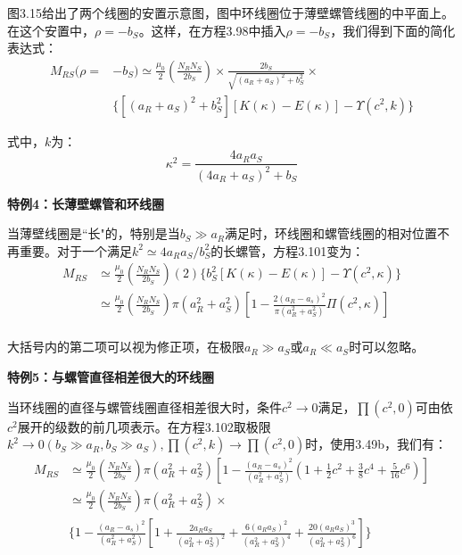 图3.15给出了两个线圈的安置示意图，图中环线圈位于薄壁螺管线圈的中平面上。在这个安置中，$\rho=-b_S$。这样，在方程3.98中插入$\rho=-b_S$，我们得到下面的简化表达式：
  \begin{equation}
  \begin{split}
M_{RS}(\rho=&-b_S)\simeq\frac{\mu_0}{2}(\frac{N_R N_S}{2b_S})\times\frac{2b_S}{\sqrt{(a_R+a_S)^2+b_S^2}}\times\\
&\{[(a_R+a_S)^2+b_S^2][K(\kappa)-E(\kappa)]-\Upsilon(c^2,k)\}%
\end{split}
\end{equation}

  式中，$k$为：
  \begin{equation*}
\kappa^2=\frac{4a_Ra_S}{(4a_R+a_S)^2+b_S}%
\end{equation*}

\textbf{特例4：长薄壁螺管和环线圈} 

当薄壁线圈是``长"的，特别是当$b_S\gg a_R$满足时，环线圈和螺管线圈的相对位置不再重要。对于一个满足$k^2\simeq 4a_R a_S/b_S^2$的长螺管，方程3.101变为：
\begin{equation}
\begin{split}
M_{RS}&\simeq\frac{\mu_0}{2}(\frac{N_RN_S}{2b_S})(2)\{b_S^2[K(\kappa)-E(\kappa)]-\Upsilon(c^2,\kappa)\}\\
&\simeq\frac{\mu_0}{2}(\frac{N_RN_S}{2b_S})\pi(a_R^2+a_S^2)[1-\frac{2(a_R-a_s)^2}{\pi(a_R^2+a_S^2)}\Pi(c^2,\kappa)]\\%
\end{split}
\end{equation}

大括号内的第二项可以视为修正项，在极限$ a_R\gg a_S$或$a_R\ll a_S$时可以忽略。

\textbf{特例5：与螺管直径相差很大的环线圈} 

当环线圈的直径与螺管线圈直径相差很大时，条件$c^2\rightarrow 0$满足，$\prod(c^2,0)$可由依$c^2$展开的级数的前几项表示。在方程3.102取极限$k^2\rightarrow 0(b_S\gg a_R,b_S\gg a_S),\prod(c^2,k)\rightarrow \prod(c^2,0)$时，使用3.49b，我们有：
  \begin{equation}
\begin{split}
M_{RS}&\simeq\frac{\mu_0}{2}(\frac{N_RN_S}{2b_S})\pi(a_R^2+a_S^2)[1-\frac{(a_R-a_s)^2}{(a_R^2+a_S^2)}(1+\frac{1}{2}c^2+\frac{3}{8}c^4+\frac{5}{16}c^6)]\\
&\simeq\frac{\mu_0}{2}(\frac{N_RN_S}{2b_S})\pi(a_R^2+a_S^2)\times \\
&\{1-\frac{(a_R-a_s)^2}{(a_R^2+a_S^2)}[1+\frac{2a_Ra_S}{(a_R^2+a_S^2)^2}+\frac{6(a_Ra_S)^2}{(a_R^2+a_S^2)^4}+\frac{20(a_Ra_S)^3}{(a_R^2+a_S^2)^6}]\}%
\end{split}
\end{equation}

